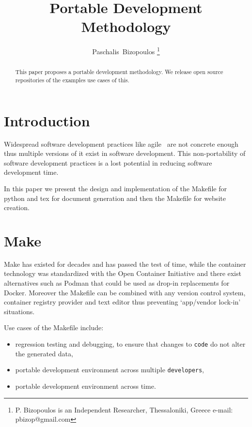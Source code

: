 \documentclass[journal]{IEEEtran}
\begin{document}
\title{Portable Development Methodology}

\author{Paschalis~Bizopoulos
\thanks{P. Bizopoulos is an Independent Researcher, Thessaloniki, Greece e-mail: pbizop@gmail.com}}

\maketitle

\begin{abstract}
	This paper proposes a portable development methodology.
	We release open source repositories of the examples use cases of this.
\end{abstract}

\section{Introduction}
Widespread software development practices like agile~\cite{abrahamsson2017agile} are not concrete enough thus multiple versions of it exist in software development.
This non-portability of software development practices is a lost potential in reducing software development time.

In this paper we present the design and implementation of the Makefile for python and tex for document generation and then the Makefile for website creation.

\section{Make}
Make has existed for decades and has passed the test of time, while the container technology was standardized with the Open Container Initiative and there exist alternatives such as Podman that could be used as drop-in replacements for Docker.
Moreover the Makefile can be combined with any version control system, container registry provider and text editor thus preventing `app/vendor lock-in' situations.

Use cases of the Makefile include:
\begin{itemize}
	\item regression testing and debugging, to ensure that changes to \texttt{code} do not alter the generated data,
	\item portable development environment across multiple \texttt{developers},
	\item portable development environment across time.
\end{itemize}
\end{document}
